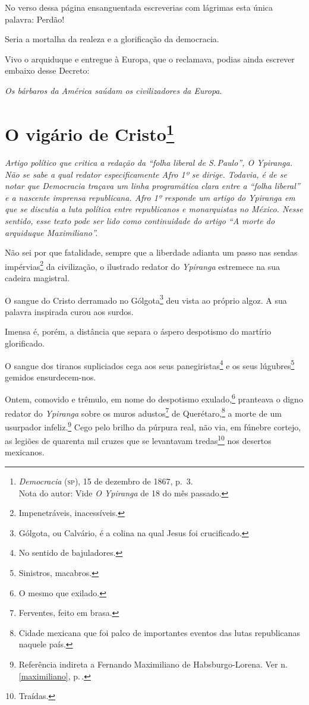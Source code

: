 No verso dessa página ensanguentada escreverias com lágrimas esta única
palavra: Perdão!

Seria a mortalha da realeza e a glorificação da democracia.

Vivo o arquiduque e entregue à Europa, que o reclamava, podias ainda
escrever embaixo desse Decreto:

\emph{Os bárbaros da América saúdam os civilizadores da Europa}.

\chapter{O vigário de Cristo\footnote{\emph{Democracia} (\textsc{sp}),
  15 de dezembro de 1867, p.~3.\\
  Nota do autor: Vide \emph{O Ypiranga} de 18 do mês passado.}}

\begin{didascalia}\itshape
Artigo político que critica a redação da ``folha liberal de S.\,Paulo'', \textnormal{O Ypiranga}. Não se sabe a qual redator
especificamente Afro 1º se dirige. Todavia, é de se notar que
\textnormal{Democracia} traçava um linha programática clara entre a ``folha
liberal'' e a nascente imprensa republicana. Afro 1º
responde um artigo do \textnormal{Ypiranga} em que se discutia a luta
política entre republicanos e monarquistas no México. Nesse sentido,
esse texto pode ser lido como continuidade do artigo ``A morte do
arquiduque Maximiliano''.
\end{didascalia}



Não sei por que fatalidade, sempre que a liberdade adianta um passo nas
sendas impérvias\footnote{Impenetráveis, inacessíveis.} da
civilização, o ilustrado redator do \emph{Ypiranga} estremece na sua
cadeira magistral.

O sangue do Cristo derramado no Gólgota\footnote{Gólgota, ou Calvário,
  é a colina na qual Jesus foi crucificado.} deu vista ao próprio algoz.
A sua palavra inspirada curou aos surdos.

Imensa é, porém, a distância que separa o áspero despotismo do martírio
glorificado.

O sangue dos tiranos supliciados cega aos seus panegiristas\footnote{
  No sentido de bajuladores.} e os seus lúgubres\footnote{Sinistros,
  macabros.} gemidos ensurdecem-nos.

Ontem, comovido e trêmulo, em nome do despotismo exulado,\footnote{O
  mesmo que exilado.} pranteava o digno redator do \emph{Ypiranga}
sobre os muros adustos\footnote{Ferventes, feito em brasa.} de
Querétaro,\footnote{Cidade mexicana que foi palco de importantes
  eventos das lutas republicanas naquele país.} a morte de um usurpador
infeliz.\footnote{Referência indireta a Fernando Maximiliano de
  Habsburgo-Lorena. Ver n.\,\ref{maximiliano}, p.\,\pageref{maximiliano}.} Cego pelo brilho da púrpura real, não via, em fúnebre
cortejo, as legiões de quarenta mil cruzes que se levantavam
tredas\footnote{Traídas.} nos desertos mexicanos.

